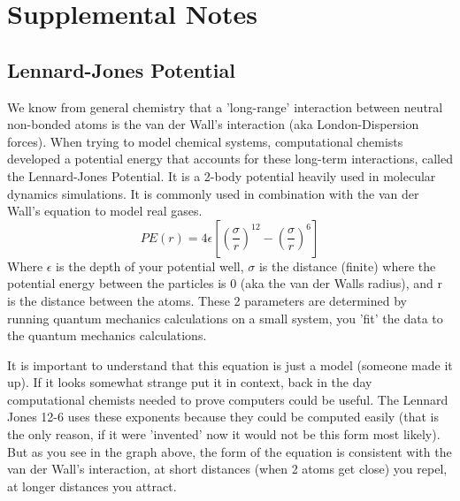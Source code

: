 \documentclass{article}
\begin{document}
\section{Supplemental Notes}

\subsection*{Lennard-Jones Potential}
We know from general chemistry that a 'long-range' interaction between neutral non-bonded atoms is the van der Wall's interaction (aka London-Dispersion forces). 
When trying to model chemical systems, computational chemists developed a potential energy that accounts for these long-term interactions, called the Lennard-Jones Potential. 
It is a 2-body potential heavily used in molecular dynamics simulations. 
It is commonly used in combination with the van der Wall's equation to model real gases.
\begin{equation}
PE(r)=4 \epsilon \left[\left(\frac {\sigma}{r}\right)^{12}-\left(\frac {\sigma}{r}\right)^6\right]
\end{equation}
Where $\epsilon$ is the depth of your potential well, $\sigma$ is the distance (finite) where the potential energy between the particles is 0 (aka the van der Walls radius), and r is the distance between the atoms.
These 2 parameters are determined by running quantum mechanics calculations on a small system, you 'fit' the data to the quantum mechanics calculations.

It is important to understand that this equation is just a model (someone made it up). 
If it looks somewhat strange put it in context, back in the day computational chemists needed to prove computers could be useful. 
The Lennard Jones 12-6 uses these exponents because they could be computed easily (that is the only reason, if it were 'invented' now it would not be this form most likely).
But as you see in the graph above, the form of the equation is consistent with the van der Wall's interaction, at short distances (when 2 atoms get close) you repel, at longer distances you attract.
\end{document}

